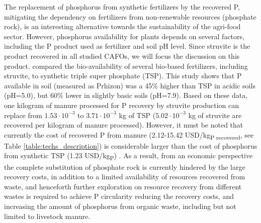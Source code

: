 \begin{refsection}[referencesCh4]
The replacement of phosphorus from synthetic fertilizers by the recovered P, mitigating the dependency on fertilizers from non-renewable resources (phosphate rock), is an interesting alternative towards the sustainability of the agri-food sector. However, phosphorus availability for plants depends on several factors, including the P product used as fertilizer and soil pH level. Since struvite is the product recovered in all studied CAFOs, we will focus the discussion on this product.
\citet{vaneeckhaute2015efficiency} compared the bio-availability of several bio-based fertilizers, including struvite, to synthetic triple super phosphate (TSP). This study shows that P available in soil (measured as Prhizon) was a 45\% higher than TSP in acidic soils (pH=5.0), but 60\% lower in slightly basic soils (pH=7.9). Based on these data, one kilogram of manure processed for P recovery by struvite production can replace from $1.53\cdot 10^{-3}$ to $3.71\cdot 10^{-3}$ kg of TSP ($5.02 \cdot 10^{-3}$ kg of struvite are recovered per kilogram of manure processed). However, it must be noted that currently the cost of recovered P from manure (2.12-15.42 USD/kg\textsubscript{P recovered}, see Table \ref{table:techs_description}) is considerable larger than the cost of phosphorus from synthetic TSP (1.23  USD/kg\textsubscript{P}) \citep{fertilizers_price}. As a result, from an economic perspective the complete substitution of phosphate rock is currently hindered by the large recovery costs, in addition to a limited availability of resources recovered from waste, and henceforth further exploration on resource recovery from different wastes is required to achieve P circularity reducing the recovery costs, and increasing the amount of phosphorus from organic waste, including but not limited to livestock manure.


\end{refsection}
